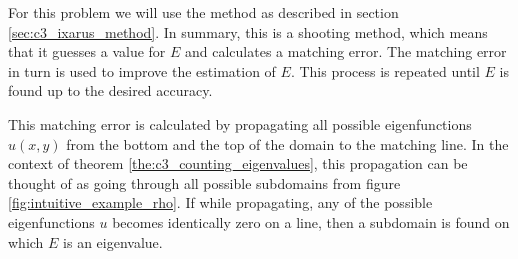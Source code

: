 For this problem we will use the method as described in section \ref{sec:c3_ixarus_method}. In summary, this is a shooting method, which means that it guesses a value for $E$ and calculates a matching error. The matching error in turn is used to improve the estimation of $E$. This process is repeated until $E$ is found up to the desired accuracy.

This matching error is calculated by propagating all possible eigenfunctions $u(x, y)$ from the bottom and the top of the domain to the matching line. In the context of theorem \ref{the:c3_counting_eigenvalues}, this propagation can be thought of as going through all possible subdomains from figure \ref{fig:intuitive_example_rho}. If while propagating, any of the possible eigenfunctions $u$ becomes identically zero on a line, then a subdomain is found on which $E$ is an eigenvalue.

